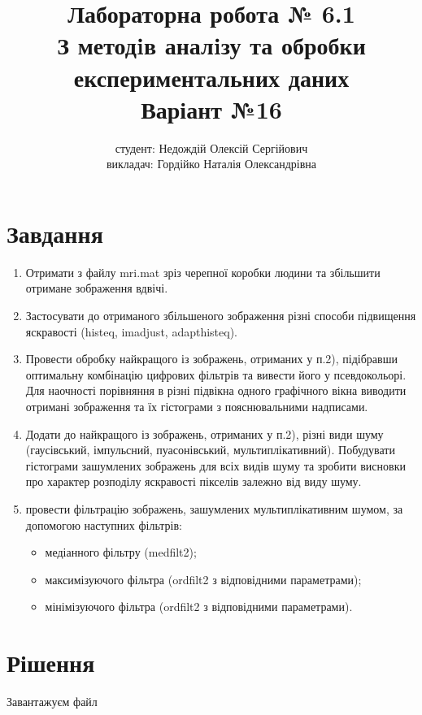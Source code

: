 \documentclass[12pt]{article}
\author{студент: Недождій Олексій Сергійович \\
         викладач: Гордійко Наталія Олександрівна}
\title{Лабораторна робота № 6.1\\
    З методiв аналiзу та обробки\\
    експериментальних даних\\
       Варіант №16}
\date{}
\begin{document}
\maketitle

\section{Завдання}
\begin{enumerate}
    \item
        Отримати з файлу mri.mat зріз черепної коробки людини та збільшити
        отримане зображення вдвічі.
    \item
        Застосувати до отриманого збільшеного зображення різні способи
        підвищення яскравості (histeq, imadjust, adapthisteq).
    \item
        Провести обробку найкращого із зображень, отриманих у п.2),
        підібравши оптимальну комбінацію цифрових фільтрів та вивести його у
        псевдокольорі. Для наочності порівняння в різні підвікна одного графічного
        вікна виводити отримані зображення та їх гістограми з пояснювальними
        надписами.
    \item
        Додати до найкращого із зображень, отриманих у п.2), різні види шуму
        (гаусівський, імпульсний, пуасонівський, мультиплікативний). Побудувати
        гістограми зашумлених зображень для всіх видів шуму та зробити висновки
        про характер розподілу яскравості пікселів залежно від виду шуму.
    \item
        провести фільтрацію зображень,
        зашумлених мультиплікативним шумом, за допомогою наступних фільтрів:
        \begin{itemize}
            \item медіанного фільтру (medfilt2);
            \item максимізуючого фільтра (ordfilt2 з відповідними параметрами);
            \item мінімізуючого фільтра (ordfilt2 з відповідними параметрами).
        \end{itemize}
\end{enumerate}

\section{Рішення}

\begin{par}
\begin{flushleft}
Завантажуєм файл
\end{flushleft}
\end{par}
\end{document}
